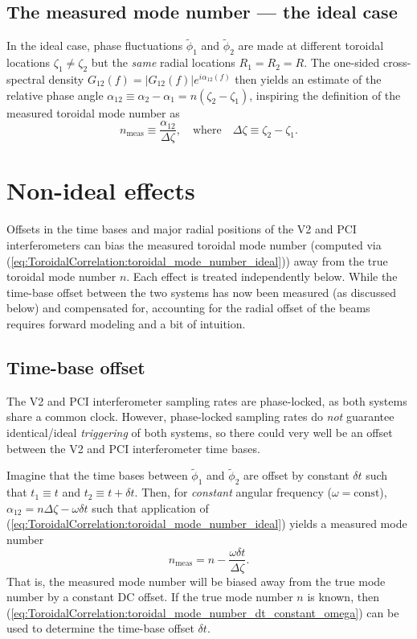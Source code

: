 \subsection{The measured mode number --- the ideal case}
In the ideal case, phase fluctuations $\tilde{\phi}_1$ and $\tilde{\phi}_2$
are made at different toroidal locations $\zeta_1 \neq \zeta_2$ but
the \emph{same} radial locations $R_1 = R_2 = R$.
The one-sided cross-spectral density
$G_{12}(f) = |G_{12}(f)| e^{i \alpha_{12}(f)}$
then yields an estimate of the relative phase angle
$\alpha_{12} \equiv \alpha_2 - \alpha_1 = n(\zeta_2 - \zeta_1)$,
inspiring the definition of the measured toroidal mode number as
\begin{equation}
  n_{\text{meas}}
  \equiv
  \frac{\alpha_{12}}{\Delta \zeta},
  \quad \text{where} \quad
  \Delta \zeta \equiv \zeta_2 - \zeta_1.
  \label{eq:ToroidalCorrelation:toroidal_mode_number_ideal}
\end{equation}


\section{Non-ideal effects}
\label{sec:ToroidalCorrelation:nonideal_effects}
Offsets in the time bases and major radial positions
of the V2 and PCI interferometers can bias
the measured toroidal mode number
(computed via (\ref{eq:ToroidalCorrelation:toroidal_mode_number_ideal}))
away from the true toroidal mode number $n$.
Each effect is treated independently below.
While the time-base offset between the two systems
has now been measured (as discussed below) and compensated for,
accounting for the radial offset of the beams requires
\graffito{\textcolor{red}{forward-modeling ref}}
forward modeling and a bit of intuition.


\subsection{Time-base offset}
The V2 and PCI interferometer sampling rates are phase-locked,
as both systems share a common clock.
However, phase-locked sampling rates do \emph{not} guarantee
identical/ideal \emph{triggering} of both systems, so
there could very well be an offset between the
V2 and PCI interferometer time bases.

Imagine that the time bases between $\tilde{\phi}_1$ and $\tilde{\phi}_2$
are offset by constant $\delta t$ such that
$t_1 \equiv t$ and $t_2 \equiv t + \delta t$.
Then, for \emph{constant} angular frequency ($\omega = \text{const}$),
$\alpha_{12} = n \Delta \zeta - \omega \delta t$
such that application of
(\ref{eq:ToroidalCorrelation:toroidal_mode_number_ideal})
yields a measured mode number
\begin{equation}
  n_{\text{meas}} = n - \frac{\omega \delta t}{\Delta \zeta}.
  \label{eq:ToroidalCorrelation:toroidal_mode_number_dt_constant_omega}
\end{equation}
That is, the measured mode number will be biased away from
the true mode number by a constant DC offset.
If the true mode number $n$ is known,
then (\ref{eq:ToroidalCorrelation:toroidal_mode_number_dt_constant_omega})
can be used to determine the time-base offset $\delta t$.

